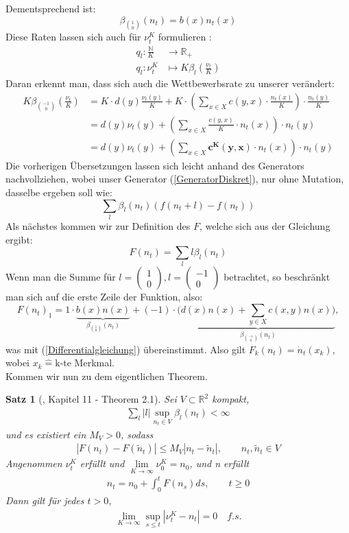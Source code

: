 \documentclass[11pt, a4paper, german]{article}
\theoremstyle{plain}
\newtheorem{satz}{Satz}[section]
\newcommand{\tvec}[2]{\begin{pmatrix}#1\\#2\end{pmatrix}}
\begin{document}
	Dementsprechend ist:
	\[ \beta_{\binom{1}{0}}(n_t)  = b(x)n_t(x) \]
	Diese Raten lassen sich auch für $ \nu_t^K $ formulieren \cite[Kapitel 11 - (1.12)]{ethier2009markov}:
\begin{align*}
	q_l: \frac{\mathbb{N}}{K} &\longrightarrow \mathbb{R}_+\\
	q_l: \nu_t^K &\longmapsto K\beta_l\left(\frac{\nu_t}{K}\right)
\end{align*}
	Daran erkennt man, dass sich auch die Wettbewerbsrate zu unserer verändert:
	\begin{align*}
		K\beta_{\binom{-1}{0}}\left(\frac{\nu_t}{K}\right) &= K \cdot d(y)\frac{\nu_t(y)}{K} +  K \cdot \left(\sum_{x \in X} c(y,x) \cdot \frac{n_t(x)}{K}\right) \cdot \frac{n_t(y)}{K}\\
		&= d(y) \nu_t(y) + \left(\sum_{x \in X} \frac{c(y,x)}{K} \cdot n_t(x)\right) \cdot n_t(y)\\
		&= d(y) \nu_t(y) + \left(\sum_{x \in X} \bm{c^K(y,x)} \cdot n_t(x)\right) \cdot n_t(y)
	\end{align*}
	Die vorherigen Übersetzungen lassen sich leicht anhand des Generators nachvollziehen, wobei unser Generator (\ref{GeneratorDiskret}), nur ohne Mutation, dasselbe ergeben soll wie: 
	\[ \sum_l \beta_l(n_t)(f(n_t + l) - f(n_t)) \]
	Als nächstes kommen wir zur Definition des $ F $, welche sich aus der Gleichung \cite[Kapitel 6 - (2.2)]{ethier2009markov} ergibt:
	\[ F(n_t) = \sum_l l \beta_l (n_t) \]
	Wenn man die Summe für $ l = \tvec{1}{0}, l = \tvec{-1}{0} $ betrachtet, so beschränkt man sich auf die erste Zeile der Funktion, also:
	\[ F(n_t)_1 = 1 \cdot \underbrace{b(x)n(x)}_{\beta_{\binom{1}{0}} (n_t)} +  (-1) \cdot ( \underbrace{d(x)n(x) + \sum_{y \in X} c(x,y)n(x))}_{\beta_{\binom{-1}{0}} (n_t)}, \]
	was mit (\ref{Differentialgleichung}) übereinstimmt. Also gilt $ F_k(n_t) = \dot{n}_t(x_k) $, wobei $ x_k \hat{=} \text{k-te} $ Merkmal.\\
	Kommen wir nun zu dem eigentlichen Theorem.
	
	\begin{satz}[\cite{ethier2009markov}, Kapitel 11 - Theorem 2.1]\label{Konvegenzsatz}
		Sei $ V \subset \mathbb{R}^2 $ kompakt,
		\begin{align}
			\sum_l |l| \sup_{n_t \in V} \beta_l(n_t) < \infty \label{RatenEndlich}
		\end{align}
		und es existiert ein $ M_V > 0 $, sodass
		\begin{align}
			|F(n_t) - F(\tilde{n}_t)| \le M_V|n_t - \tilde{n}_t|, \qquad n_t, \tilde{n}_t \in V \label{Lipschitz}
		\end{align}
		Angenommen $ \nu_t^K $ erfüllt \cite[Kapitel 11 - (2.3)]{ethier2009markov} und $ \lim\limits_{K \to \infty} \nu_0^K = n_0 $, und n erfüllt
		\begin{align}
			n_t = n_0 + \int_{0}^{t} F(n_s) ds, \qquad t \ge 0 \label{Integralgleichung}
		\end{align}
		Dann gilt für jedes $ t > 0 $,
		\begin{align}
			\lim\limits_{K \to \infty} \sup_{s \le t} | \nu_t^K - n_t | = 0 \quad f.s. \label{Kovergenzbehauptung}
		\end{align}
	\end{satz}
	
\end{document}
